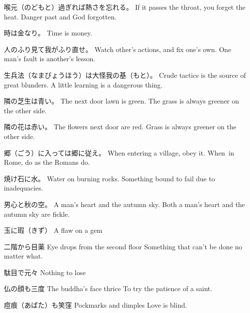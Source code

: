 \par{喉元（のどもと）過ぎれば熱さを忘れる。 \hfill\break
If it passes the throat, you forget the heat. \hfill\break
Danger past and God forgotten. }

\par{時は金なり。 \hfill\break
Time is money. }

\par{人のふり見て我がふり直せ。 \hfill\break
Watch other's actions, and fix one's own. \hfill\break
One man's fault is another's lesson. }

\par{生兵法（なまびょうほう）は大怪我の基（もと）。 \hfill\break
Crude tactics is the source of great blunders. \hfill\break
A little learning is a dangerous thing. }

\par{隣の芝生は青い。 \hfill\break
The next door lawn is green. \hfill\break
The grass is always greener on the other side. }

\par{隣の花は赤い。 \hfill\break
The flowers next door are red. \hfill\break
Grass is always greener on the other side. }

\par{郷（ごう）に入っては郷に従え。 \hfill\break
When entering a village, obey it. \hfill\break
When in Rome, do as the Romans do. }

\par{焼け石に水。 \hfill\break
Water on burning rocks. \hfill\break
Something bound to fail due to inadequacies. }

\par{男心と秋の空。 \hfill\break
A man's heart and the autumn sky. \hfill\break
Both a man's heart and the autumn sky are fickle. }

\par{玉に瑕（きず） \hfill\break
A flaw on a gem }

\par{二階から目薬 \hfill\break
Eye drops from the second floor \hfill\break
Something that can't be done no matter what. }

\par{駄目で元々 \hfill\break
Nothing to lose }

\par{仏の顔も三度 \hfill\break
The buddha's face thrice \hfill\break
To try the patience of a saint. }

\par{痘痕（あばた）も笑窪 \hfill\break
Pockmarks and dimples \hfill\break
Love is blind. }

